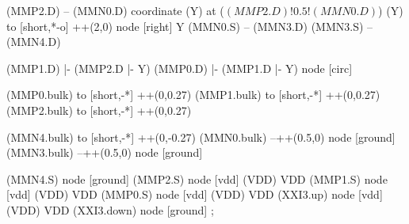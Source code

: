 \begin{circuitikz}[american]
	(MMP2.D) -- (MMN0.D)
	coordinate (Y) at ($(MMP2.D)!0.5!(MMN0.D)$)
	(Y) to [short,*-o] ++(2,0) node [right] {Y}
	(MMN0.S) -- (MMN3.D)
	(MMN3.S) -- (MMN4.D)
	
	(MMP1.D) |- (MMP2.D |- Y)
	(MMP0.D) |- (MMP1.D |- Y) node [circ] {}
	
	(MMP0.bulk) to [short,-*] ++(0,0.27)
	(MMP1.bulk) to [short,-*] ++(0,0.27)
	(MMP2.bulk) to [short,-*] ++(0,0.27)
	
	(MMN4.bulk) to [short,-*] ++(0,-0.27)
	(MMN0.bulk) --++(0.5,0) node [ground] {}
	(MMN3.bulk) --++(0.5,0) node [ground] {}
	

	(MMN4.S) node [ground] {}
	(MMP2.S) node [vdd] (VDD) {VDD}
	(MMP1.S) node [vdd] (VDD) {VDD}
	(MMP0.S) node [vdd] (VDD) {VDD}
	(XXI3.up) node [vdd] (VDD) {VDD}
	(XXI3.down) node [ground] {}
;

\end{circuitikz}
